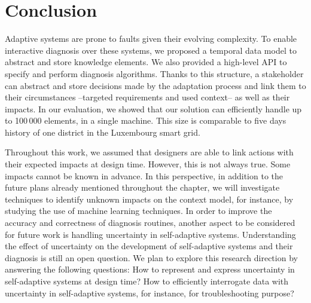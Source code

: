\section{Conclusion}
\label{sec:tkm:conclusion}

Adaptive systems are prone to faults  given their evolving complexity.
To enable interactive diagnosis over these systems, we proposed a temporal data model to abstract and store knowledge elements. We also provided a high-level API to specify and perform diagnosis algorithms.
Thanks to this structure, a stakeholder can abstract and store decisions made by the adaptation process and link them to their circumstances --targeted requirements and used context-- as well as their impacts.
In our evaluation, we showed that our solution can efficiently handle up to 100\,000 elements, in a single machine.
This size is comparable to five days history of one district in the Luxembourg smart grid.


Throughout this work, we assumed that designers are able to link actions with their expected impacts at design time. However, this is not always true. Some impacts  cannot be known in advance.
In this perspective, in addition to the future plans already mentioned throughout the chapter, we will investigate techniques to identify unknown impacts on the context model, for instance, by studying the use of machine learning  techniques.
In order to improve the accuracy and correctness of diagnosis routines, another aspect to be considered for future work is handling uncertainty in self-adaptive systems.
Understanding the effect of uncertainty on the development of self-adaptive systems and their diagnosis is still an open question.
We plan to explore this research direction by answering the following questions: How to represent and express uncertainty in self-adaptive systems at design time?
How to efficiently interrogate data with uncertainty in self-adaptive systems,  for instance, for troubleshooting purpose?